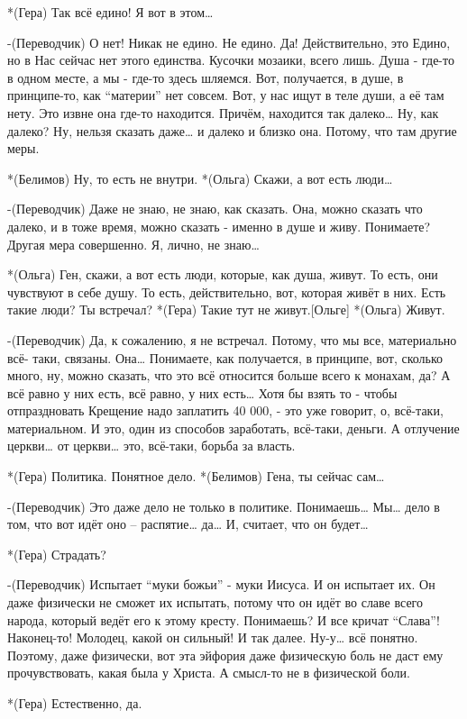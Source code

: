 *(Гера) Так всё едино! Я вот в этом…

-(Переводчик) О нет! Никак не едино. Не едино. Да! Действительно, это Едино, но в Нас сейчас нет этого единства. Кусочки мозаики, всего лишь. Душа - где-то в одном месте, а мы - где-то здесь шляемся. Вот, получается, в душе, в принципе-то, как “материи” нет совсем. Вот, у нас ищут в теле души, а её там нету. Это извне она где-то находится. Причём, находится так далеко… Ну, как далеко? Ну, нельзя сказать даже… и далеко и близко она. Потому, что там другие меры.

*(Белимов) Ну, то есть не внутри.
*(Ольга) Скажи, а вот есть люди…

-(Переводчик) Даже не знаю, не знаю, как сказать. Она, можно сказать что далеко, и в тоже время, можно сказать - именно в душе и живу. Понимаете? Другая мера совершенно. Я, лично, не знаю…

*(Ольга) Ген, скажи, а вот есть люди, которые, как душа, живут. То есть, они чувствуют в себе душу. То есть,  действительно, вот, которая живёт в них. Есть такие люди? Ты встречал?
*(Гера) Такие тут не живут.[Ольге]
*(Ольга) Живут.

-(Переводчик) Да, к сожалению, я не встречал. Потому, что мы все, материально всё- таки, связаны. Она… Понимаете, как получается, в принципе, вот, сколько много, ну, можно сказать, что это всё относится больше всего к монахам, да? А всё равно у них есть, всё равно, у них есть… Хотя бы взять то - чтобы отпраздновать Крещение надо заплатить 40 000, -  это уже говорит, о, всё-таки, материальном. И это, один из способов заработать, всё-таки, деньги. А отлучение церкви… от церкви… это, всё-таки, борьба за власть. 

*(Гера) Политика. Понятное дело.
*(Белимов) Гена, ты сейчас сам…

-(Переводчик) Это даже дело не только в политике. Понимаешь… Мы… дело в том, что вот идёт оно – распятие… да… И, считает, что он будет…

*(Гера) Страдать?

-(Переводчик) Испытает “муки божьи” -  муки Иисуса. И он испытает их. Он даже физически не сможет их испытать, потому что он идёт во славе всего народа, который ведёт его к этому кресту. Понимаешь? И все кричат “Слава”! Наконец-то! Молодец, какой он сильный! И так далее. Ну-у… всё понятно.  Поэтому, даже физически, вот эта эйфория даже физическую боль не даст ему прочувствовать, какая была у Христа. А смысл-то не в физической боли.

*(Гера) Естественно, да.

